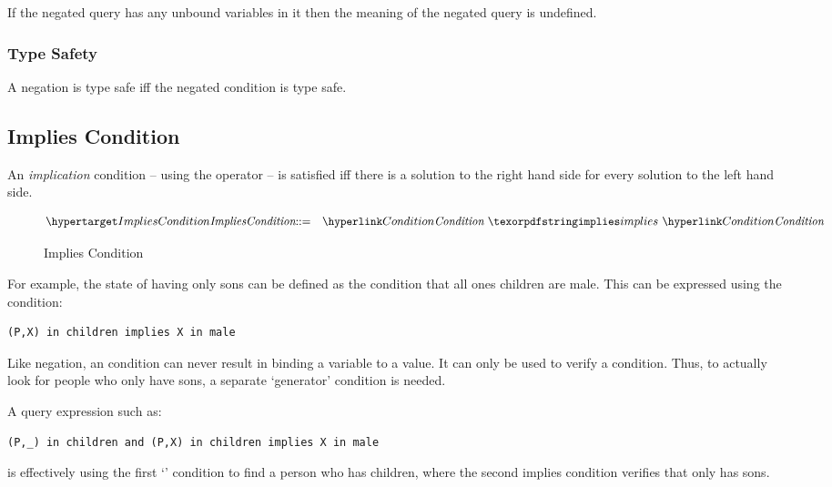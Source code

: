 \begin{aside}
If the negated query has any unbound variables in it then the meaning of the negated query is undefined.
\end{aside}

\subsubsection{Type Safety}
A negation is type safe iff the negated condition is type safe.
\begin{prooftree}
\end{prooftree}

\subsection{Implies Condition}
An \emph{implication} condition -- using the  operator -- is satisfied iff there is a solution to the right hand side for every solution to the left hand side.


\begin{figure}[htbp]
\begin{eqnarray*}
\ntDef{ImpliesCondition}&\arrow&\ntRef{Condition}\ \q{implies}\ \ntRef{Condition}
\end{eqnarray*}
\caption{Implies Condition}
\label{impliesConditionFormFig}
\end{figure}

For example, the state of having only sons can be defined as the condition that all ones children are male. This can be expressed using the condition:
\begin{lstlisting}
(P,X) in children implies X in male 
\end{lstlisting}

\begin{aside}
Like negation, an  condition can never result in binding a variable to a value. It can only be used to verify a condition. Thus, to actually look for people who only have sons, a separate `generator' condition is needed. 

A query expression such as:
\begin{lstlisting}
(P,_) in children and (P,X) in children implies X in male
\end{lstlisting}
is effectively using the first `' condition to find a person who has children, where the second implies condition verifies that only has sons.
\end{aside}


